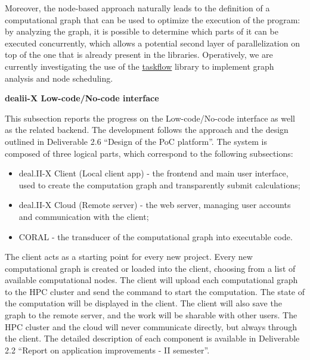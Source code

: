 \documentclass[a4paper,12pt, numbers]{article}
\begin{document}
Moreover, the node-based approach naturally leads to the definition of a computational graph that can be used to optimize the execution of the program: by analyzing the graph, it is possible to determine which parts of it can be executed concurrently, which allows a potential second layer of parallelization on top of the one that is already present in the libraries. Operatively, we are currently investigating the use of the \href{https://github.com/taskflow/taskflow}{taskflow} library to implement graph analysis and node scheduling.   


\noindent\textbf{dealii-X Low-code/No-code interface}

This subsection reports the progress on the Low-code/No-code interface as well as the related backend. The development follows the approach and the design outlined in Deliverable 2.6 ``Design of the PoC platform''. The system is composed of three logical parts, which correspond to the following subsections:
\begin{itemize}
\item deal.II-X Client (Local client app) - the frontend and main user interface, used to create the computation graph and transparently submit calculations;
\item deal.II-X Cloud (Remote server) - the web server, managing user accounts and communication with the client;
\item CORAL - the transducer of the computational graph into executable code.
\end{itemize}


The client acts as a starting point for every new project. Every new computational graph is created or loaded into the client, choosing from a list of available computational nodes. The client will upload each computational graph to the HPC cluster and send the command to start the computation. The state of the computation will be displayed in the client. The client will also save the graph to the remote server, and the work will be sharable with other users. The HPC cluster and the cloud will never communicate directly, but always through the client. The detailed description of each component is available in Deliverable 2.2 ``Report on application improvements - II semester''.
\end{document}
